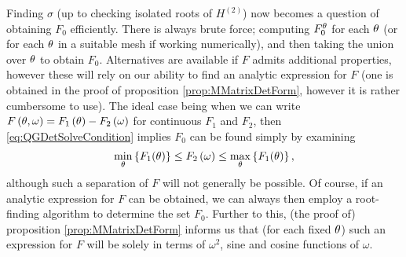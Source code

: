 Finding $\sigma$ (up to checking isolated roots of $H^{(2)}$) now becomes a question of obtaining $F_0$ efficiently.
There is always brute force; computing $F_0^{\theta}$ for each $\theta$ (or for each $\theta$ in a suitable mesh if working numerically), and then taking the union over $\theta$ to obtain $F_0$.
Alternatives are available if $F$ admits additional properties, however these will rely on our ability to find an analytic expression for $F$ (one is obtained in the proof of proposition \ref{prop:MMatrixDetForm}, however it is rather cumbersome to use).
The ideal case being when we can write $F\left( \theta,\omega \right) = F_1\left( \theta \right) - F_2\left( \omega \right)$ for continuous $F_1$ and $F_2$, then \eqref{eq:QGDetSolveCondition} implies $F_0$ can be found simply by examining
\begin{align*}
	\min_{\theta}\left\{ F_1(\theta) \right\} \leq F_2\left( \omega \right) \leq \max_{\theta}\left\{ F_1(\theta) \right\},
\end{align*} 
although such a separation of $F$ will not generally be possible.
Of course, if an analytic expression for $F$ can be obtained, we can always then employ a root-finding algorithm to determine the set $F_0$.
Further to this, (the proof of) proposition \ref{prop:MMatrixDetForm} informs us that (for each fixed $\theta$) such an expression for $F$ will be solely in terms of $\omega^2$, sine and cosine functions of $\omega$.

